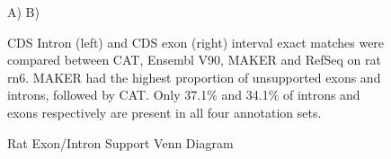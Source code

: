 \documentclass[fleqn,10pt]{wlscirep}
\begin{document}
\begin{figure}
\centering
A)
B)
\caption{Rat Exon/Intron Support Venn Diagram}
CDS Intron (left) and CDS exon (right) interval exact matches were compared between CAT, Ensembl V90, MAKER and RefSeq on rat rn6. MAKER had the highest proportion of unsupported exons and introns, followed by CAT. Only 37.1\% and 34.1\% of introns and exons respectively are present in all four annotation sets.
\label{supp_fig:rat_exon_intron}
\end{figure}
\end{document}
